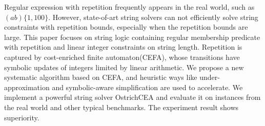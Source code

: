 \documentclass{standalone}
\begin{document}
Regular expression with repetition frequently appears in the real world, such as $(ab)\{1, 100\}$. However, state-of-art string
solvers can not efficiently solve string constraints with repetition bounds,
especially when the repetition bounds are large. This paper focuses on
string logic containing regular membership predicate with repetition
and linear integer constraints on string length. Repetition is captured
by cost-enriched finite automaton(CEFA), whose transitions have symbolic updates of integers limited by linear arithmetic. We propose a new systematic algorithm based on CEFA, and heuristic ways
like under-approximation and symbolic-aware simplification are used to
accelerate. We implement a powerful string solver OstrichCEA and
evaluate it on instances from the real world and other typical benchmarks.
The experiment result shows superiority.


\end{document}
